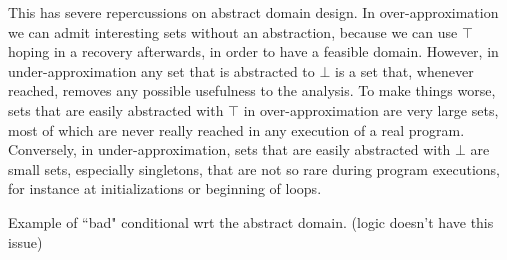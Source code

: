This has severe repercussions on abstract domain design. In over-approximation we can admit interesting sets without an abstraction, because we can use $\top$ hoping in a recovery afterwards, in order to have a feasible domain. However, in under-approximation any set that is abstracted to $\bot$ is a set that, whenever reached, removes any possible usefulness to the analysis.
To make things worse, sets that are easily abstracted with $\top$ in over-approximation are very large sets, most of which are never really reached in any execution of a real program. Conversely, in under-approximation, sets that are easily abstracted with $\bot$ are small sets, especially singletons, that are not so rare during program executions, for instance at initializations or beginning of loops.

Example of ``bad" conditional wrt the abstract domain. (logic doesn't have this issue)
